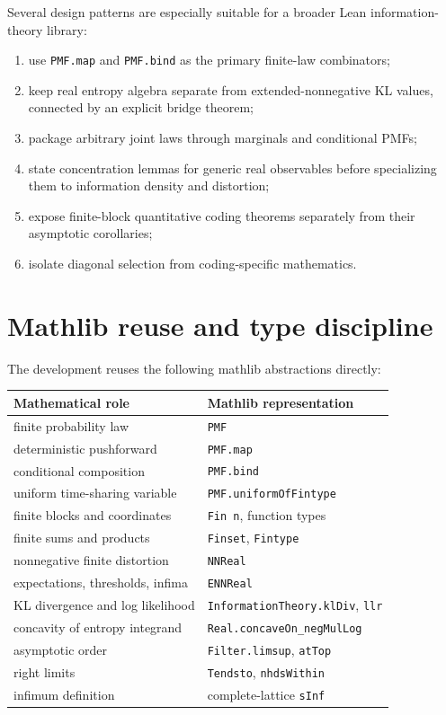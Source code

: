 \documentclass[11pt]{article}
\begin{document}
Several design patterns are especially suitable for a broader Lean
information-theory library:
\begin{enumerate}
  \item use \texttt{PMF.map} and \texttt{PMF.bind} as the primary finite-law
        combinators;
  \item keep real entropy algebra separate from extended-nonnegative KL values,
        connected by an explicit bridge theorem;
  \item package arbitrary joint laws through marginals and conditional PMFs;
  \item state concentration lemmas for generic real observables before
        specializing them to information density and distortion;
  \item expose finite-block quantitative coding theorems separately from their
        asymptotic corollaries;
  \item isolate diagonal selection from coding-specific mathematics.
\end{enumerate}

\section{Mathlib reuse and type discipline}

The development reuses the following mathlib abstractions directly:
\begin{center}
\begin{tabular}{ll}
\toprule
Mathematical role & Mathlib representation \\
\midrule
finite probability law & \texttt{PMF} \\
deterministic pushforward & \texttt{PMF.map} \\
conditional composition & \texttt{PMF.bind} \\
uniform time-sharing variable & \texttt{PMF.uniform\allowbreak Of\allowbreak Fintype} \\
finite blocks and coordinates & \texttt{Fin n}, function types \\
finite sums and products & \texttt{Finset}, \texttt{Fintype} \\
nonnegative finite distortion & \texttt{NNReal} \\
expectations, thresholds, infima & \texttt{ENNReal} \\
KL divergence and log likelihood & \texttt{Information\allowbreak Theory.kl\allowbreak Div}, \texttt{llr} \\
concavity of entropy integrand & \texttt{Real.concave\allowbreak On\_\allowbreak neg\allowbreak Mul\allowbreak Log} \\
asymptotic order & \texttt{Filter.limsup}, \texttt{at\allowbreak Top} \\
right limits & \texttt{Tendsto}, \texttt{nhds\allowbreak Within} \\
infimum definition & complete-lattice \texttt{s\allowbreak Inf} \\
\bottomrule
\end{tabular}
\end{center}
\end{document}
